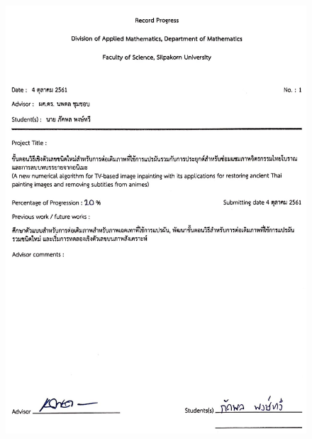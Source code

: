 \pagestyle{plain}
\begin{figure}
    \includegraphics[width=\linewidth]{image/approval_letter/report_01.jpg}
\end{figure}
\clearpage
